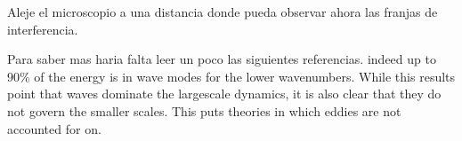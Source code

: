 \documentclass[laboratorio]{guia}
\begin{document}
Aleje el microscopio a una distancia donde pueda observar ahora las franjas de
interferencia.


        
\begin{sabermas}
Para saber mas haria falta leer un poco las siguientes referencias.
indeed up to 90\% of the energy is in wave modes for the lower
wavenumbers. While this results point that waves dominate the largescale
dynamics, it is also clear that they do not govern the smaller scales.
This puts theories in which eddies are not accounted for on.
\end{sabermas}

% 
% 
\end{document}
